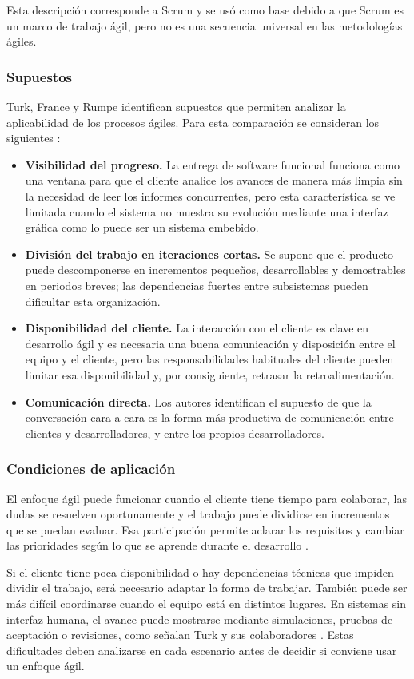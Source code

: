 Esta descripción corresponde a Scrum y se usó como base debido a que Scrum es un marco de trabajo ágil, pero no es una secuencia universal en las metodologías ágiles.

\subsubsection{Supuestos}

Turk, France y Rumpe identifican supuestos que permiten analizar la aplicabilidad de los procesos ágiles. Para esta comparación se consideran los siguientes \cite{turk2014}:

\begin{itemize}
	\item \textbf{Visibilidad del progreso.} La entrega de software funcional funciona como una ventana para que el cliente analice los avances de manera más limpia sin la necesidad de leer los informes concurrentes, pero esta característica se ve limitada cuando el sistema no muestra su evolución mediante una interfaz gráfica como lo puede ser un sistema embebido.
	
	\item \textbf{División del trabajo en iteraciones cortas.} Se supone que el producto puede descomponerse en incrementos pequeños, desarrollables y demostrables en periodos breves; las dependencias fuertes entre subsistemas pueden dificultar esta organización.
	
	\item \textbf{Disponibilidad del cliente.} La interacción con el cliente es clave en desarrollo ágil y es necesaria una buena comunicación y disposición entre el equipo y el cliente, pero las responsabilidades habituales del cliente pueden limitar esa disponibilidad y, por consiguiente, retrasar la retroalimentación.
	
	\item \textbf{Comunicación directa.} Los autores identifican el supuesto de que la conversación cara a cara es la forma más productiva de comunicación entre clientes y desarrolladores, y entre los propios desarrolladores.
\end{itemize}

\subsubsection{Condiciones de aplicación}

El enfoque ágil puede funcionar cuando el cliente tiene tiempo para colaborar, las dudas se resuelven oportunamente y el trabajo puede dividirse en incrementos que se puedan evaluar. Esa participación permite aclarar los requisitos y cambiar las prioridades según lo que se aprende durante el desarrollo \cite{schon2017,turk2014}.

Si el cliente tiene poca disponibilidad o hay dependencias técnicas que impiden dividir el trabajo, será necesario adaptar la forma de trabajar. También puede ser más difícil coordinarse cuando el equipo está en distintos lugares. En sistemas sin interfaz humana, el avance puede mostrarse mediante simulaciones, pruebas de aceptación o revisiones, como señalan Turk y sus colaboradores \cite{turk2014}. Estas dificultades deben analizarse en cada escenario antes de decidir si conviene usar un enfoque ágil.